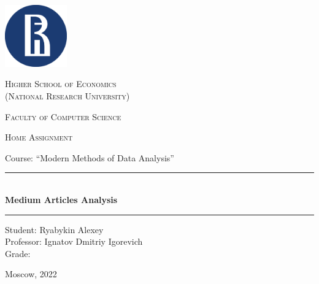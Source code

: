 \newcommand{\HRule}{\rule{\linewidth}{0.5mm}}

\begin{titlepage}

\centering
	\includegraphics[width=0.2\textwidth]{./title/logohse.png}\par\vspace{1cm}
	{\scshape \LARGE Higher School of Economics \\ \small(National Research University)\par}
	{\scshape \Large Faculty of Computer Science\par}
	\vspace{3cm}
	{\scshape\Large Home Assignment \par \Large{Course: ``Modern Methods of Data Analysis''}\par}
    \HRule \\[0.5cm]
    { \Large \bfseries Medium Articles Analysis}\\[0.2cm] %
    \HRule
	\vspace{3.5cm}
	\begin{flushright}
	Student: Ryabykin Alexey \\
	Professor: Ignatov Dmitriy Igorevich
	\\
	Grade: \underline{\hspace{0.2cm}}
    \end{flushright}
    \vfill

	{\large Moscow, 2022}
\end{titlepage}